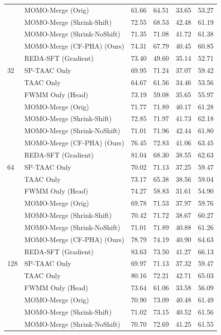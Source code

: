 \documentclass{article}
\theoremstyle{plain}
\theoremstyle{definition}
\theoremstyle{remark}
\begin{document}
\begin{table}[t]
\begin{center}
\begin{small}
\begin{sc}
\begin{tabular}{llcccc}
& MOMO-Merge (Orig) & 61.66 & 64.51 & 33.65 & 53.27 \\
& MOMO-Merge (Shrink-Shift) & 72.55 & 68.53 & 42.48 & 61.19 \\
& MOMO-Merge (Shrink-NoShift) & 71.35 & 71.08 & 41.72 & 61.38 \\
& MOMO-Merge (CF-PHA) (Ours) & 74.31 & 67.79 & 40.45 & 60.85 \\
& REDA-SFT (Gradient) & 73.40 & 49.60 & 35.14 & 52.71 \\
\midrule
32 & SP-TAAC Only & 69.95 & 71.24 & 37.07 & 59.42 \\
& TAAC Only & 64.67 & 61.56 & 34.46 & 53.56 \\
& FWMM Only (Head) & 73.19 & 59.08 & 35.65 & 55.97 \\
& MOMO-Merge (Orig) & 71.77 & 71.89 & 40.17 & 61.28 \\
& MOMO-Merge (Shrink-Shift) & 72.85 & 71.97 & 41.73 & 62.18 \\
& MOMO-Merge (Shrink-NoShift) & 71.01 & 71.96 & 42.44 & 61.80 \\
& MOMO-Merge (CF-PHA) (Ours) & 76.45 & 72.83 & 41.06 & 63.45 \\
& REDA-SFT (Gradient) & 81.04 & 68.30 & 38.55 & 62.63 \\
\midrule
64 & SP-TAAC Only & 70.02 & 71.13 & 37.25 & 59.47 \\
& TAAC Only & 73.17 & 65.38 & 38.56 & 59.04 \\
& FWMM Only (Head) & 74.27 & 58.83 & 31.61 & 54.90 \\
& MOMO-Merge (Orig) & 69.78 & 71.53 & 37.97 & 59.76 \\
& MOMO-Merge (Shrink-Shift) & 70.42 & 71.72 & 38.67 & 60.27 \\
& MOMO-Merge (Shrink-NoShift) & 71.01 & 71.89 & 40.88 & 61.26 \\
& MOMO-Merge (CF-PHA) (Ours) & 78.79 & 74.19 & 40.90 & 64.63 \\
& REDA-SFT (Gradient) & 83.63 & 73.50 & 41.27 & 66.13 \\
\midrule
128 & SP-TAAC Only & 69.97 & 71.13 & 37.32 & 59.47 \\
& TAAC Only & 80.16 & 72.21 & 42.71 & 65.03 \\
& FWMM Only (Head) & 73.64 & 61.06 & 33.58 & 56.09 \\
& MOMO-Merge (Orig) & 70.90 & 73.09 & 40.48 & 61.49 \\
& MOMO-Merge (Shrink-Shift) & 71.02 & 73.15 & 40.52 & 61.56 \\
& MOMO-Merge (Shrink-NoShift) & 70.70 & 72.69 & 41.25 & 61.55 \\

\end{tabular}
\end{sc}
\end{small}
\end{center}
\end{table}
\end{document}
